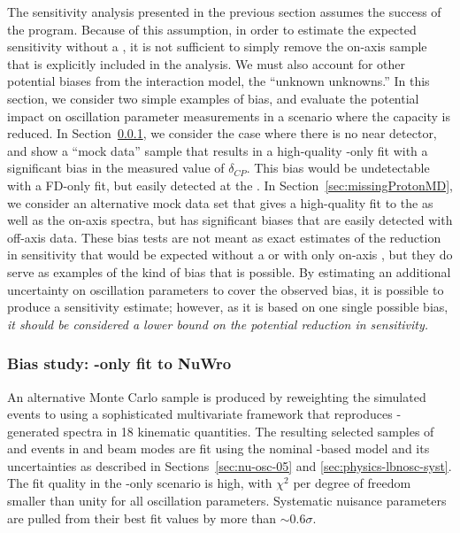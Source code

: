 The sensitivity analysis presented in the previous section assumes the success of the  program. Because of this assumption, in order to estimate the expected sensitivity without a , it is not sufficient to simply remove the on-axis   sample that is explicitly included in the analysis. We must also account for other potential biases from the interaction model, the ``unknown unknowns.'' In this section, we consider two simple examples of bias, and evaluate the potential impact on oscillation parameter measurements in a scenario where the  capacity is reduced. In Section~\ref{sec:FDonlyNuWro}, we consider the case where there is no near detector, and show a ``mock data'' sample that results in a high-quality -only fit with a significant bias in the measured value of $\delta_{CP}$. This bias would be undetectable with a FD-only fit, but easily detected at the . In Section~\ref{sec:missingProtonMD}, we consider an alternative mock data set that gives a high-quality fit to the  as well as the on-axis  spectra, but has significant biases that are easily detected with off-axis  data. These bias tests are not meant as exact estimates of the reduction in sensitivity that would be expected without a  or with only on-axis , but they do serve as examples of the kind of bias that is possible. By estimating an additional uncertainty on oscillation parameters to cover the observed bias, it is possible to produce a sensitivity estimate; however, as it is based on one single possible bias, {\em it should be considered a lower bound on the potential reduction in sensitivity.}

\subsubsection{Bias study: -only fit to NuWro}
\label{sec:FDonlyNuWro}

An alternative Monte Carlo sample is produced by reweighting the  simulated events to  using a sophisticated multivariate framework that reproduces -generated spectra in 18 kinematic quantities. The resulting selected samples of  \numu and \nue {} events in  and  beam modes are fit using the nominal -based model and its uncertainties as described in Sections~\ref{sec:nu-osc-05} and \ref{sec:physics-lbnosc-syst}. The fit quality in the -only scenario is high, with $\chi^{2}$ per degree of freedom smaller than unity for all oscillation parameters. Systematic nuisance parameters are pulled from their best fit values by more than $\sim$0.6$\sigma$. 

